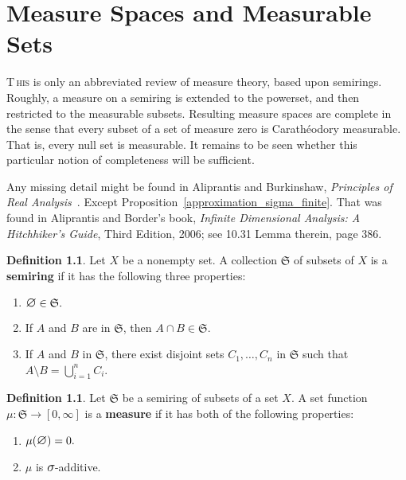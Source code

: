 \documentclass[
twoside=true,
paper=letter,
fontsize=9pt,
pagesize=auto,
leqno,
openany,
headsepline,
overfullrule,
]{scrbook}
\theoremstyle{plain}
\theoremstyle{plain}
\theoremstyle{definition}
\newtheorem{defn}[thm]{Definition}
\theoremstyle{bfnoteitalic}
\theoremstyle{bfnoteroman}
\newcommand{\term}[1]{\textbf{#1}\index{#1}}
\newcommand{\sigalg}[1]{\mathfrak{#1}}
\newcommand{\textsigma}{\hbox{\large{$\sigma$}}\kern-1pt}
\newcommand{\mtset}{\hbox{\large{$\varnothing$}}}
\newcommand{\meets}{\cap}
\newcommand{\semiring}{\sigalg{S}}
\newcommand{\measurespace}{X}
\newcommand{\measure}{\mu}
\begin{document}
\chapter{Measure Spaces and Measurable Sets}
\lettrine{T}{\,his} is only an abbreviated review of measure theory, based upon semirings.
Roughly, a measure on a semiring is extended to the powerset, and then restricted to the measurable subsets.  Resulting measure spaces are complete in the sense that every subset of a set of measure zero is 
Carath\'{e}odory measurable. That is, every null set is measurable.
It remains to be seen whether this particular notion of completeness will be sufficient.


Any missing detail might be found in  Aliprantis and Burkinshaw, \textsl{Principles of Real Analysis}~\cite{pora_aliprantis_1990}. Except Proposition~\ref{approximation_sigma_finite}. That was found in Aliprantis and Border's book, \textsl{Infinite Dimensional Analysis: A Hitchhiker's Guide}, Third Edition, 2006; see 10.31 Lemma therein, page 386.

\begin{defn}
Let $\measurespace$ be a nonempty set.  A collection $\semiring$ of subsets of $\measurespace$ is a \textbf{semiring} if it has the following three properties:
\begin{enumerate} %
\item $\mtset\in\semiring.$
\item If $A$ and $B$ are in $\semiring$, then $A\meets B\in\semiring$. 
\item If  $A$ and $B$ in $\semiring$, there exist disjoint sets $C_1, \ldots , C_n$ in $\semiring$ such that $A\setminus B =\bigcup_{i=1}^{n}C_i$.
\end{enumerate}
\end{defn}

 
\begin{defn}
Let $\semiring$ be a semiring of subsets of a set $\measurespace$. A set function $\measure:\semiring\to [0,\infty]$ is a \term{measure} if it has both of the following properties:
\begin{enumerate}
\item $\measure(\mtset) = 0.$
\item $\measure$ is $\textsigma$-additive.
\end{enumerate} 
\end{defn} 
\end{document}
